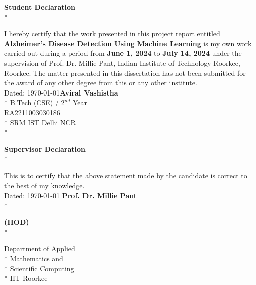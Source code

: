 \documentclass[a4paper,12pt]{report}
\begin{document}
\clearpage
\begin{center}
\thispagestyle{empty}
{\fontsize{16pt}{20pt}\selectfont \textbf{Student Declaration}} \\*
\vspace{1cm}
\par  

I hereby certify that the work presented in this project report entitled {\bf Alzheimer's Disease Detection Using Machine Learning} is my own work carried out during a period from \textbf{June 1, 2024} to \textbf{July 14, 2024} under the supervision of Prof. Dr. Millie Pant, Indian Institute of Technology Roorkee, Roorkee. The matter presented in this dissertation has not been submitted for the award of any other degree from this or any other institute.\\
\vspace{3cm}
Dated: \today \hspace{5.2cm}\textbf{Aviral Vashistha} \\*
\hspace{9cm}B.Tech (CSE) / $2^{nd}$ Year\\
\hspace{9cm}RA2211003030186\\*
\hspace{9cm}SRM IST Delhi NCR\\*
\vspace{2cm}

{\fontsize{16pt}{20pt}\selectfont \textbf{Supervisor Declaration}} \\*  
\vspace{1cm}
\par  

This is to certify that the above statement made by the candidate is correct to the best of my knowledge.\\
\vspace{3cm}
Dated: \today \hspace{5cm} \textbf{Prof. Dr. Millie Pant} \\*

\hspace{9cm}\textbf{(HOD)} \\*

\hspace{9cm}Department of Applied\\*
\hspace{9cm}Mathematics and\\*
\hspace{9cm}Scientific Computing\\*
\hspace{9cm}IIT Roorkee

\end{center}
\end{document}
